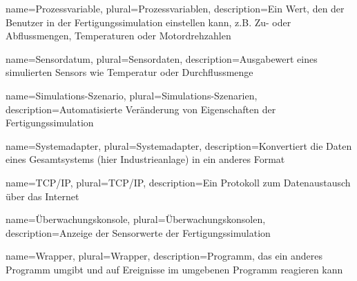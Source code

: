 {
  name=Prozessvariable,
  plural=Prozessvariablen,
  description={Ein Wert, den der Benutzer in der \gls{Fertigungssimulation} einstellen kann, z.B. Zu- oder Abflussmengen, Temperaturen oder Motordrehzahlen}
}

{
  name=Sensordatum,
  plural=Sensordaten,
  description={Ausgabewert eines simulierten Sensors wie Temperatur oder Durchflussmenge}
}

{
  name=Simulations-Szenario,
  plural=Simulations-Szenarien,
  description={Automatisierte Veränderung von Eigenschaften der Fertigungssimulation}
}

{
  name=Systemadapter,
  plural=Systemadapter,
  description={Konvertiert die Daten eines Gesamtsystems (hier Industrieanlage) in ein anderes Format}
}

{
  name=TCP/IP,
  plural=TCP/IP,
  description={Ein Protokoll zum Datenaustausch über das Internet}
}

{
  name=Überwachungskonsole,
  plural=Überwachungskonsolen,
  description={Anzeige der Sensorwerte der Fertigungssimulation}
}

{
  name=Wrapper,
  plural=Wrapper,
  description={Programm, das ein anderes Programm umgibt und auf Ereignisse im umgebenen Programm reagieren kann}
}